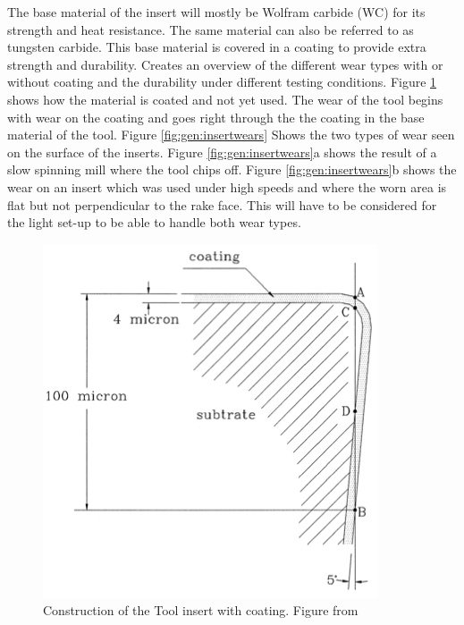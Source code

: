 	The base material of the insert will mostly be Wolfram carbide (WC) for its strength and heat resistance. The same material can also be referred to as tungsten carbide. This base material is covered in a coating to provide extra strength and durability.
	\cite{Gu1999} Creates an overview of the different wear types with or without coating and the durability under different testing conditions. Figure \ref{fig:alg:insertConstruction} shows how the material is coated and not yet used. 
	The wear of the tool begins with wear on the coating and goes right through the the coating in the base material of the tool. 
	Figure \ref{fig:gen:insertwears} Shows the two types of wear seen on the surface of the inserts. Figure \ref{fig:gen:insertwears}a shows the result of a slow spinning mill where the tool chips off. Figure \ref{fig:gen:insertwears}b shows the wear on an insert which was used under high speeds and where the worn area is flat but not perpendicular to the rake face. This will have to be considered for the light set-up to be able to handle both wear types.
	
	
	\begin{figure}[hbtp]
	\centering
	\includegraphics[scale=0.5]{fig/algemeen/plaatjes/Figuren/Insert_construction.png}
	\caption{Construction of the Tool insert with coating. Figure from \citep{Gu1999}}
	\label{fig:alg:insertConstruction}
	\end{figure}
	
